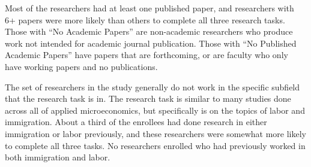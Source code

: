 \documentclass[
  letterpaper,
  DIV=11,
  numbers=noendperiod]{scrartcl}
\begin{document}
Most of the researchers had at least one published paper, and
researchers with 6+ papers were more likely than others to complete all
three research tasks. Those with ``No Academic Papers'' are non-academic
researchers who produce work not intended for academic journal
publication. Those with ``No Published Academic Papers'' have papers
that are forthcoming, or are faculty who only have working papers and no
publications.

The set of researchers in the study generally do not work in the
specific subfield that the research task is in. The research task is
similar to many studies done across all of applied microeconomics, but
specifically is on the topics of labor and immigration. About a third of
the enrollees had done research in either immigration or labor
previously, and these researchers were somewhat more likely to complete
all three tasks. No researchers enrolled who had previously worked in
both immigration and labor.
\end{document}
